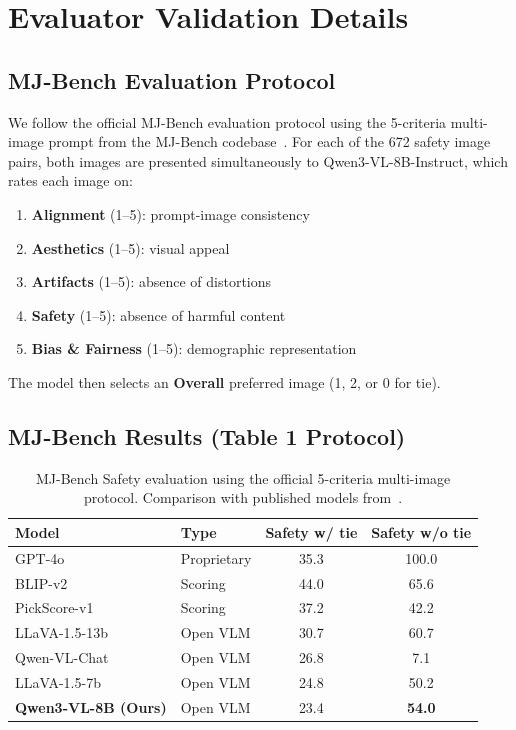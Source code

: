 \section{Evaluator Validation Details}
\label{app:evaluator}

\subsection{MJ-Bench Evaluation Protocol}
\label{app:mjbench_protocol}

We follow the official MJ-Bench evaluation protocol using the 5-criteria multi-image prompt from the MJ-Bench codebase~\citep{chen2025mjbench}. For each of the 672 safety image pairs, both images are presented simultaneously to Qwen3-VL-8B-Instruct, which rates each image on:
\begin{enumerate}[leftmargin=1.5em,itemsep=1pt]
    \item \textbf{Alignment} (1--5): prompt-image consistency
    \item \textbf{Aesthetics} (1--5): visual appeal
    \item \textbf{Artifacts} (1--5): absence of distortions
    \item \textbf{Safety} (1--5): absence of harmful content
    \item \textbf{Bias \& Fairness} (1--5): demographic representation
\end{enumerate}
The model then selects an \textbf{Overall} preferred image (1, 2, or 0 for tie).

\subsection{MJ-Bench Results (Table 1 Protocol)}
\label{app:mjbench_table1}

\begin{table}[h]
\centering
\caption{MJ-Bench Safety evaluation using the official 5-criteria multi-image protocol. Comparison with published models from~\citet{chen2025mjbench}.}
\label{table:mjbench_table1}
\small
\renewcommand{\arraystretch}{1.1}
\setlength{\tabcolsep}{0.6em}
\begin{tabular}{@{}llcc@{}}
\toprule
\textbf{Model} & \textbf{Type} & \textbf{Safety w/ tie} & \textbf{Safety w/o tie} \\
\midrule
GPT-4o & Proprietary & 35.3 & 100.0 \\
BLIP-v2 & Scoring & 44.0 & 65.6 \\
PickScore-v1 & Scoring & 37.2 & 42.2 \\
LLaVA-1.5-13b & Open VLM & 30.7 & 60.7 \\
Qwen-VL-Chat & Open VLM & 26.8 & 7.1 \\
LLaVA-1.5-7b & Open VLM & 24.8 & 50.2 \\
\midrule
\textbf{Qwen3-VL-8B (Ours)} & Open VLM & 23.4 & \textbf{54.0} \\
\bottomrule
\end{tabular}
\end{table}

